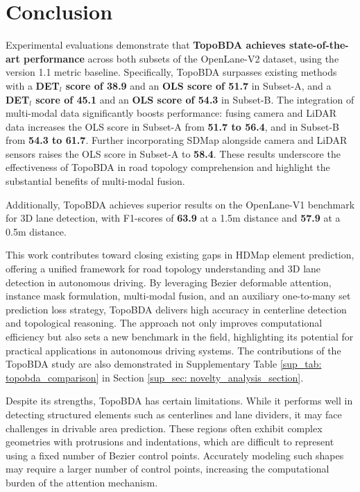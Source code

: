 \section{Conclusion}

Experimental evaluations demonstrate that \textbf{TopoBDA achieves state-of-the-art performance} across both subsets of the OpenLane-V2 dataset, using the version 1.1 metric baseline. Specifically, TopoBDA surpasses existing methods with a \textbf{DET$_l$ score of 38.9} and an \textbf{OLS score of 51.7} in Subset-A, and a \textbf{DET$_l$ score of 45.1} and an \textbf{OLS score of 54.3} in Subset-B. The integration of multi-modal data significantly boosts performance: fusing camera and LiDAR data increases the OLS score in Subset-A from \textbf{51.7 to 56.4}, and in Subset-B from \textbf{54.3 to 61.7}. Further incorporating SDMap alongside camera and LiDAR sensors raises the OLS score in Subset-A to \textbf{58.4}. These results underscore the effectiveness of TopoBDA in road topology comprehension and highlight the substantial benefits of multi-modal fusion.

Additionally, TopoBDA achieves superior results on the OpenLane-V1 benchmark for 3D lane detection, with F1-scores of \textbf{63.9} at a 1.5m distance and \textbf{57.9} at a 0.5m distance.

This work contributes toward closing existing gaps in HDMap element prediction, offering a unified framework for road topology understanding and 3D lane detection in autonomous driving. By leveraging Bezier deformable attention, instance mask formulation, multi-modal fusion, and an auxiliary one-to-many set prediction loss strategy, TopoBDA delivers high accuracy in centerline detection and topological reasoning. The approach not only improves computational efficiency but also sets a new benchmark in the field, highlighting its potential for practical applications in autonomous driving systems. The contributions of the TopoBDA study are also demonstrated in Supplementary Table \ref{sup_tab: topobda_comparison} in Section \ref{sup_sec: novelty_analysis_section}. 

Despite its strengths, TopoBDA has certain limitations. While it performs well in detecting structured elements such as centerlines and lane dividers, it may face challenges in drivable area prediction. These regions often exhibit complex geometries with protrusions and indentations, which are difficult to represent using a fixed number of Bezier control points. Accurately modeling such shapes may require a larger number of control points, increasing the computational burden of the attention mechanism.

